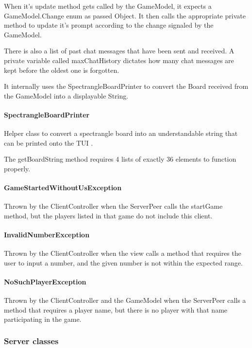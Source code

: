 \documentclass[12pt, letterpaper]{article}
\begin{document}
    When it's update method gets called by the GameModel, it expects a GameModel.Change enum as passed Object.
    It then calls the appropriate private method to update it's prompt according to the change signaled by the
    GameModel.

    There is also a list of past chat messages that have been sent and received.
    A private variable called maxChatHistory dictates how many chat messages are
    kept before the oldest one is forgotten.

    It internally uses the SpectrangleBoardPrinter to convert the Board received from the GameModel into a displayable
    String.

    \paragraph{SpectrangleBoardPrinter}
    Helper class to convert a spectrangle board into an understandable string that can be printed onto the TUI .

    The getBoardString method requires 4 lists of exactly 36 elements to function properly.

    \paragraph{GameStartedWithoutUsException}
    Thrown by the ClientController when the ServerPeer calls the startGame method, but the
    players listed in that game do not include this client.

    \paragraph{InvalidNumberException}
    Thrown by the ClientController when the view calls a method that requires the user to input a number, and
    the given number is not within the expected range.

    \paragraph{NoSuchPlayerException}
    Thrown by the ClientController and the GameModel when the ServerPeer calls a method that requires a player name,
    but there is no player with that name participating in the game.



    \subsubsection{Server classes}
\end{document}
